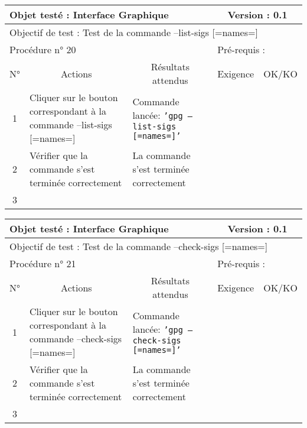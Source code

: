 \documentclass{../res/univ-projet}
\begin{document}
\begin{center}
\begin{tabular}{|c|p{5cm}|p{5cm}|p{1.5cm}|p{1.5cm}|}
\hline
\multicolumn{3}{|l|}{Objet testé : Interface Graphique} & \multicolumn{2}{c|}{Version : 0.1}\\ \hline
\multicolumn{5}{|l|}{Objectif de test : Test de la commande –list-sigs [=names=]}\\ \hline
\multicolumn{3}{|l|}{Procédure n° 20} & \multicolumn{2}{p{3cm}|}{Pré-requis : }\\ \hline
\multicolumn{1}{|c|}{N°} & \multicolumn{1}{c|}{Actions} & \multicolumn{1}{c|}{Résultats attendus} & 
\multicolumn{1}{c|}{Exigence} & \multicolumn{1}{c|}{OK/KO}\\ \hline
1 & Cliquer sur le bouton correspondant à la commande –list-sigs [=names=] & Commande lancée: \texttt{'gpg –list-sigs [=names=]'} &  & \\
2 & Vérifier que la commande s'est terminée correctement & La commande s'est terminée correctement &  & \\
3 &  &  &  & \\ \hline
\end{tabular}
\vskip 2.2cm


\begin{tabular}{|c|p{5cm}|p{5cm}|p{1.5cm}|p{1.5cm}|}
\hline
\multicolumn{3}{|l|}{Objet testé : Interface Graphique} & \multicolumn{2}{c|}{Version : 0.1}\\ \hline
\multicolumn{5}{|l|}{Objectif de test : Test de la commande –check-sigs [=names=]}\\ \hline
\multicolumn{3}{|l|}{Procédure n° 21} & \multicolumn{2}{p{3cm}|}{Pré-requis : }\\ \hline
\multicolumn{1}{|c|}{N°} & \multicolumn{1}{c|}{Actions} & \multicolumn{1}{c|}{Résultats attendus} & 
\multicolumn{1}{c|}{Exigence} & \multicolumn{1}{c|}{OK/KO}\\ \hline
1 & Cliquer sur le bouton correspondant à la commande –check-sigs [=names=] & Commande lancée: \texttt{'gpg –check-sigs [=names=]'} &  & \\
2 & Vérifier que la commande s'est terminée correctement & La commande s'est terminée correctement &  & \\
3 &  &  &  & \\ \hline
\end{tabular}
\vskip 2.2cm



\end{center}
\end{document}
